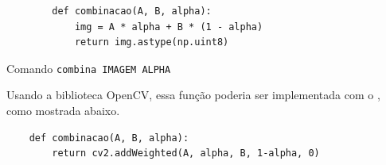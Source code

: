 \begin{listing}[H]
    \begin{verbatim}
        def combinacao(A, B, alpha):
            img = A * alpha + B * (1 - alpha)
            return img.astype(np.uint8)
    \end{verbatim}

    \caption{Comando \texttt{combina IMAGEM ALPHA}}
\end{listing}

Usando a biblioteca OpenCV, essa função poderia ser implementada com o  \autocite{ref:addweighted}, como mostrada abaixo.

\begin{verbatim}
    def combinacao(A, B, alpha):
        return cv2.addWeighted(A, alpha, B, 1-alpha, 0)
\end{verbatim}

